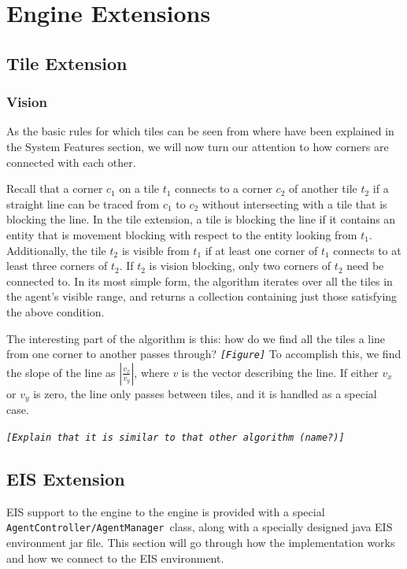
\section{Engine Extensions}


\subsection{Tile Extension}


\subsubsection*{Vision}

As the basic rules for which tiles can be seen from where have been
explained in the System Features section, we will now turn our attention
to how corners are connected with each other. 

Recall that a corner $c_{1}$ on a tile $t_{1}$ connects to a corner
$c_{2}$ of another tile $t_{2}$ if a straight line can be traced
from $c_{1}$ to $c_{2}$ without intersecting with a tile that is
blocking the line. In the tile extension, a tile is blocking the line
if it contains an entity that is movement blocking with respect to
the entity looking from $t_{1}$. Additionally, the tile $t_{2}$
is visible from $t_{1}$ if at least one corner of $t_{1}$ connects
to at least three corners of $t_{2}$. If $t_{2}$ is vision blocking,
only two corners of $t_{2}$ need be connected to. In its most simple
form, the algorithm iterates over all the tiles in the agent's visible
range, and returns a collection containing just those satisfying the
above condition. 

The interesting part of the algorithm is this: how do we find all
the tiles a line from one corner to another passes through? \texttt{\emph{{[}Figure{]}}}
To accomplish this, we find the slope of the line as $\left|\frac{v_{x}}{v_{y}}\right|$,
where $v$ is the vector describing the line. If either $v_{x}$ or
$v_{y}$ is zero, the line only passes between tiles, and it is handled
as a special case.

\texttt{\emph{{[}Explain that it is similar to that other algorithm
(name?){]}}}


\subsection{EIS Extension}

EIS support to the engine to the engine is provided with a special
\texttt{AgentController/AgentManager }class, along with a specially
designed java EIS environment jar file. This section will go through
how the implementation works and how we connect to the EIS environment.

